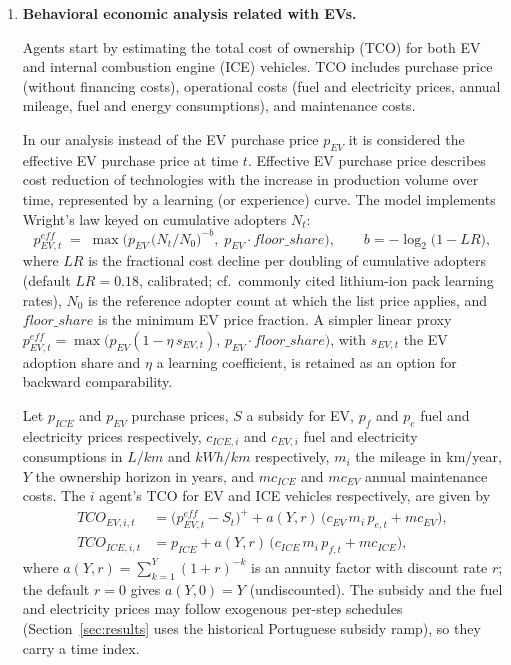 \documentclass[11pt]{article}
\begin{document}
\begin{enumerate}
  The growing demand for EVs underscores the critical need for efficient and
  accessible charging infrastructure (\cite{mohammed2024}).

\item \textbf{Behavioral economic analysis related with EVs.}

  Agents start by estimating the total cost of ownership (TCO) for both EV
  and internal combustion engine (ICE) vehicles. TCO includes purchase price
  (without financing costs), operational costs (fuel and electricity prices,
  annual mileage, fuel and energy consumptions), and maintenance costs.

  In our analysis instead of the EV purchase price $p_{EV}$ it is considered
  the effective EV purchase price at time $t$. Effective EV purchase price
  describes cost reduction of technologies with the increase in production
  volume over time, represented by a learning (or experience) curve. The
  model implements Wright's law keyed on cumulative adopters $N_t$:
  \begin{equation}
    p^{e\!f\!f}_{EV,t} \;=\;
    \max\!\Big( p_{EV}\,\big(N_t / N_0\big)^{-b},\;
                p_{EV}\cdot \mathit{floor\_share} \Big),
    \qquad b = -\log_2\!\big(1 - \mathit{LR}\big),
  \end{equation}
  where $\mathit{LR}$ is the fractional cost decline per doubling of
  cumulative adopters (default $\mathit{LR}=0.18$, calibrated;
  cf.\ commonly cited lithium-ion pack learning rates), $N_0$ is the
  reference adopter count at which the list price applies, and
  $\mathit{floor\_share}$ is the minimum EV price fraction. A simpler linear
  proxy $p^{e\!f\!f}_{EV,t} = \max\big(p_{EV}(1-\eta\, s_{EV,t}),\,
  p_{EV}\cdot\mathit{floor\_share}\big)$, with $s_{EV,t}$ the EV adoption
  share and $\eta$ a learning coefficient, is retained as an option for
  backward comparability.

  Let $p_{ICE}$ and $p_{EV}$ purchase prices, $S$ a subsidy for EV, $p_f$
  and $p_e$ fuel and electricity prices respectively, $c_{ICE,i}$ and
  $c_{EV,i}$ fuel and electricity consumptions in $L/km$ and $kWh/km$
  respectively, $m_i$ the mileage in km/year, $Y$ the ownership horizon in
  years, and $\mathit{mc}_{ICE}$ and $\mathit{mc}_{EV}$ annual maintenance
  costs. The $i$ agent's TCO for EV and ICE vehicles respectively, are
  given by
  \begin{align}
    TCO_{EV,i,t}  &= \big(p^{e\!f\!f}_{EV,t} - S_t\big)^{+}
      + a(Y, r)\,\big(c_{EV}\, m_i\, p_{e,t} + \mathit{mc}_{EV}\big),\\
    TCO_{ICE,i,t} &= p_{ICE}
      + a(Y, r)\,\big(c_{ICE}\, m_i\, p_{f,t} + \mathit{mc}_{ICE}\big),
  \end{align}
  where $a(Y,r)=\sum_{k=1}^{Y}(1+r)^{-k}$ is an annuity factor with
  discount rate $r$; the default $r=0$ gives $a(Y,0)=Y$ (undiscounted).
  The subsidy and the fuel and electricity prices may follow exogenous
  per-step schedules (Section~\ref{sec:results} uses the historical
  Portuguese subsidy ramp), so they carry a time index.


\end{enumerate}
\end{document}
